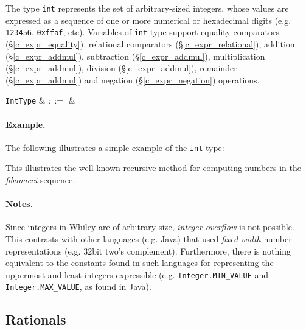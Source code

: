 The type \lstinline{int} represents the set of arbitrary-sized integers, whose values are expressed as a sequence of one or more numerical or hexadecimal digits (e.g. \lstinline{123456}, \lstinline{0xffaf}, etc).  Variables of \lstinline{int} type support equality comparators (\S\ref{c_expr_equality}), relational comparators (\S\ref{c_expr_relational}), addition (\S\ref{c_expr_addmul}), subtraction (\S\ref{c_expr_addmul}), multiplication (\S\ref{c_expr_addmul}), division (\S\ref{c_expr_addmul}), remainder (\S\ref{c_expr_addmul}) and negation (\S\ref{c_expr_negation}) operations.


\begin{syntax}
  \verb+IntType+ & $::=$ &  \\
\end{syntax}

\paragraph{Example.} The following illustrates a simple example of the \lstinline{int} type:



This illustrates the well-known recursive method for computing numbers in the {\em fibonacci} sequence.

\paragraph{Notes.}  Since integers in Whiley are of arbitrary size, {\em integer overflow} is not possible.  This contrasts with other languages (e.g. Java) that used {\em fixed-width} number representations (e.g. 32bit two's complement).  Furthermore, there is nothing equivalent to the constants found in such languages for representing the uppermost and least integers expressible (e.g. \lstinline{Integer.MIN_VALUE} and \lstinline{Integer.MAX_VALUE}, as found in Java).

\subsection{Rationals}
\label{c_types_real}

